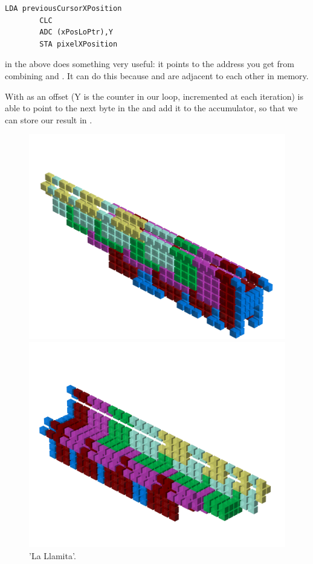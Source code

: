 \begin{lstlisting}[basicstyle=\ttfamily\scriptsize]
        LDA previousCursorXPosition
        CLC 
        ADC (xPosLoPtr),Y
        STA pixelXPosition
\end{lstlisting}

 in the above does something very useful: it points to the address you get from combining
  and  . It can do this because 
and  are adjacent to each other in memory.

With  as an offset  (Y is the counter in our loop,
incremented at each iteration)  is able to point to the next byte in the  and add it to
the accumulator, so that we can store our result in .
 
\clearpage
\begin{figure}[H]
    \centering
    \begin{adjustbox}{width=12cm,center}
      \includegraphics[width=12cm]{src/patterns/pattern2-45.png}%
    \end{adjustbox}
    \begin{adjustbox}{width=12cm,margin=0cm -4cm}
      \includegraphics[width=12cm]{src/patterns/pattern2-225.png}%
    \end{adjustbox}
\caption{'La Llamita'.}
\end{figure}
\clearpage

